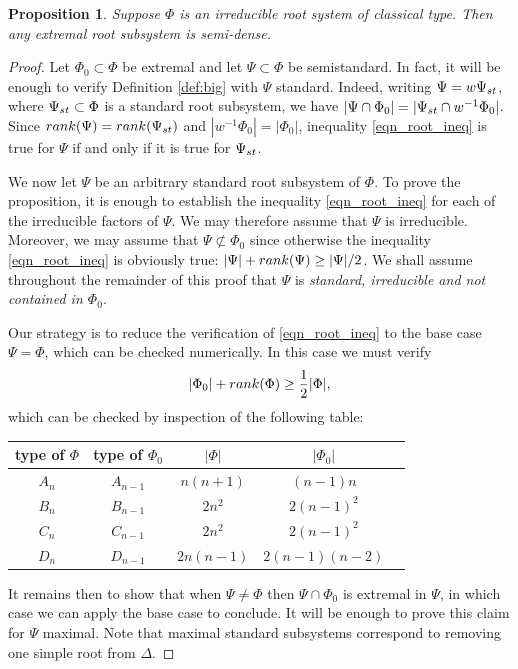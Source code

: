 \documentclass[10pt,a4paper]{amsart}
\newtheorem{proposition}{Proposition}
\begin{document}
\begin{proposition}
\label{Sibd}
    Suppose $\Phi$ is an irreducible root system of classical type. Then any extremal root subsystem is semi-dense. 
\end{proposition}

\begin{proof}
Let $\Phi_0\subset\Phi$ be extremal and let $\Psi\subset\Phi$ be semistandard. In fact, it will be enough to verify Definition \ref{def:big} with $\Psi$ standard. Indeed, writing $\Psi=w\Psi_{\rm st}$, where $\Psi_{\rm st}\subset\Phi$ is a standard root subsystem, we have $|\Psi \cap \Phi_0| = |\Psi_{\rm st} \cap w^{-1} \Phi_0|$. Since $\textnormal{rank}(\Psi)=\textnormal{rank}(\Psi_{\rm st})$ and $|w^{-1}\Phi_0|=|\Phi_0|$, inequality \eqref{eqn_root_ineq} is true for $\Psi$ if and only if it is true for $\Psi_{\rm st}$. 

We now let $\Psi$ be an arbitrary standard root subsystem of $\Phi$. To prove the proposition, it is enough to establish the inequality \eqref{eqn_root_ineq} for each of the irreducible factors of $\Psi$. We may therefore assume that $\Psi$ is irreducible. Moreover, we may assume that $\Psi\not\subset\Phi_0$ since otherwise the inequality \eqref{eqn_root_ineq}  is obviously true: $|\Psi|+\textnormal{rank}(\Psi)\geq |\Psi|/2$. We shall assume throughout the remainder of this proof that $\Psi$ is \textit{standard, irreducible and not contained in $\Phi_0$.}

Our strategy is to reduce  the verification of \eqref{eqn_root_ineq} to the base case $\Psi=\Phi$, which can be checked numerically. In this case we must verify
    \begin{equation}\label{basic-big-ineq}
        |\Phi_0|+\textnormal{rank}(\Phi) \geq \frac{1}{2} |\Phi|,
    \end{equation}
which can be checked by inspection of the following table:

    \begin{table}[H]
    \centering
 \begin{tabular}{|c|c|c|c|c|}
 \hline
  type of $\Phi$ & type of $\Phi_0$ & $|\Phi|$ & $|\Phi_0|$ \\ \hline  
  $A_n$ &$A_{n-1}$ & $n(n+1)$ & $(n-1)n$ \\
  $B_n$& $B_{n-1}$& $2 n^2$ & $2 (n-1)^2$  \\
  $C_n$& $C_{n-1}$& $2 n^2$& $2 (n-1)^2$ \\
  $D_n$& $D_{n-1}$& $2 n(n-1)$& $2(n-1)(n-2)$ \\
  \hline
 \end{tabular}
\end{table}
\noindent It remains then to show that when $\Psi\neq \Phi$ then $\Psi \cap \Phi_0$ is extremal in $\Psi$, in which case we can apply the base case to conclude. 
It will be enough to prove this claim for $\Psi$ maximal. Note that maximal standard subsystems correspond to removing one simple root from $\Delta$.


\end{proof}
\end{document}
